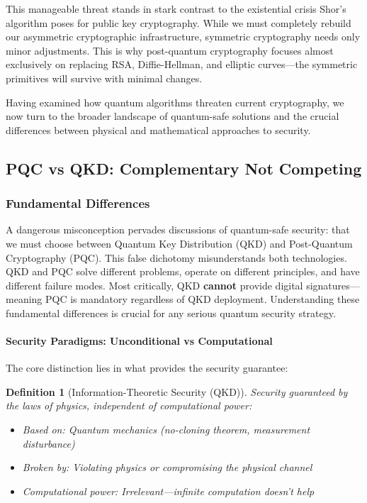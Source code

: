 \documentclass[11pt,a4paper]{article}
\newtheorem{definition}{Definition}
\begin{document}
This manageable threat stands in stark contrast to the existential crisis Shor's algorithm poses for public key cryptography. While we must completely rebuild our asymmetric cryptographic infrastructure, symmetric cryptography needs only minor adjustments. This is why post-quantum cryptography focuses almost exclusively on replacing RSA, Diffie-Hellman, and elliptic curves---the symmetric primitives will survive with minimal changes.

Having examined how quantum algorithms threaten current cryptography, we now turn to the broader landscape of quantum-safe solutions and the crucial differences between physical and mathematical approaches to security.

\subsection{PQC vs QKD: Complementary Not Competing}
\label{sec:pqc-vs-qkd}

\subsubsection{Fundamental Differences}

A dangerous misconception pervades discussions of quantum-safe security: that we must choose between Quantum Key Distribution (QKD) and Post-Quantum Cryptography (PQC). This false dichotomy misunderstands both technologies. QKD and PQC solve different problems, operate on different principles, and have different failure modes. Most critically, QKD \textbf{cannot} provide digital signatures---meaning PQC is mandatory regardless of QKD deployment. Understanding these fundamental differences is crucial for any serious quantum security strategy.

\paragraph{Security Paradigms: Unconditional vs Computational}

The core distinction lies in what provides the security guarantee:

\begin{definition}[Information-Theoretic Security (QKD)]
Security guaranteed by the laws of physics, independent of computational power:
\begin{itemize}
    \item Based on: Quantum mechanics (no-cloning theorem, measurement disturbance)
    \item Broken by: Violating physics or compromising the physical channel
    \item Computational power: Irrelevant---infinite computation doesn't help
\end{itemize}
\end{definition}
\end{document}
